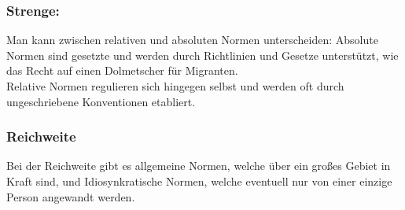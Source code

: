 \documentclass{article}
\begin{document}
	\subsubsection{Strenge:}
	Man kann zwischen relativen und absoluten Normen unterscheiden:
	Absolute Normen sind gesetzte und werden durch Richtlinien und Gesetze unterstützt, wie das Recht auf einen Dolmetscher für Migranten. \\
	Relative Normen regulieren sich hingegen selbst und werden oft durch ungeschriebene Konventionen etabliert. \\
	\subsubsection{Reichweite}
	Bei der Reichweite gibt es allgemeine Normen, welche über ein großes Gebiet in Kraft sind, und Idiosynkratische Normen, welche eventuell nur von einer einzige Person angewandt werden. \\
\end{document}
